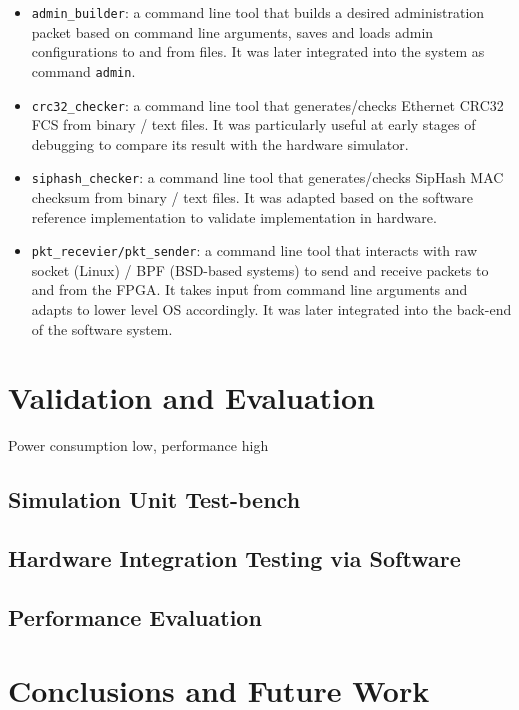 \documentclass[a4paper]{report}
\newcommand{\code}{\texttt}
\begin{document}
\begin{itemize}
    \item \code{admin\_builder}: a command line tool that builds a desired administration packet based on command line arguments, saves and loads admin configurations to and from files. It was later integrated into the system as command \code{admin}.
    \item \code{crc32\_checker}: a command line tool that generates/checks Ethernet CRC32 FCS from binary / text files. It was particularly useful at early stages of debugging to compare its result with the hardware simulator.
    \item \code{siphash\_checker}: a command line tool that generates/checks SipHash MAC checksum from binary / text files. It was adapted based on the software reference implementation \cite{aumasson-bernstein-2012} to validate implementation in hardware.
    \item \code{pkt\_recevier/pkt\_sender}: a command line tool that interacts with raw socket (Linux) / BPF (BSD-based systems) to send and receive packets to and from the FPGA. It takes input from command line arguments and adapts to lower level OS accordingly. It was later integrated into the back-end of the software system.
\end{itemize}


\chapter{Validation and Evaluation}

Power consumption low, performance high

\section{Simulation Unit Test-bench}

\section{Hardware Integration Testing via Software}

\section{Performance Evaluation}

\chapter{Conclusions and Future Work}
\end{document}
